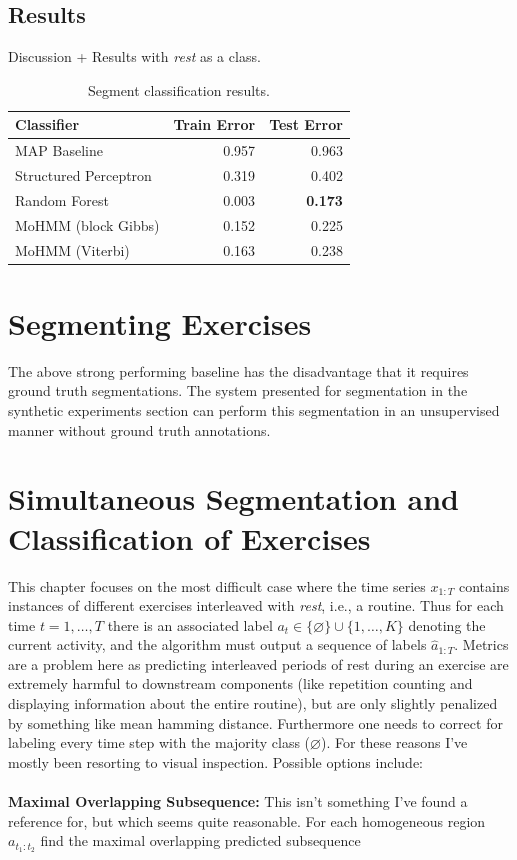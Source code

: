 \documentclass[12pt]{report}
\newcommand{\1}[0]{\mathbbm{1}}
\newcommand{\seq}[3]{\ensuremath{#1_{{#2}:{#3}}}}
\begin{document}
\section{Results}
Discussion + Results with \emph{rest} as a class.
\begin{table}[ht]
    \centering
    \begin{tabular}{l r r}\hline
    \textbf{Classifier} & \textbf{Train Error} &\textbf{Test Error} \\\hline
    MAP Baseline & 0.957 & 0.963 \\
    Structured Perceptron & 0.319 & 0.402 \\
    Random Forest & 0.003 & \textbf{0.173} \\
    MoHMM (block Gibbs) & 0.152 & 0.225 \\
    MoHMM (Viterbi) & 0.163 & 0.238 \\
    \end{tabular}
    \caption{Segment classification results.}
    \label{table:segment-results}
\end{table}

\chapter{Segmenting Exercises}
The above strong performing baseline has the disadvantage that it requires ground truth
segmentations. The system presented for segmentation in the synthetic experiments section
can perform this segmentation in an unsupervised manner without ground truth annotations.

\chapter{Simultaneous Segmentation and Classification of Exercises}
This chapter focuses on the most difficult case where the time series $\seq{x}{1}{T}$
contains instances of different exercises interleaved with \emph{rest}, i.e., a routine. 
Thus for each time $t = 1,\ldots,T$ there is an associated label 
$a_t \in \{\varnothing\} \cup \{1, \ldots, K\}$ denoting the current activity, and the algorithm
must output a sequence of labels $\seq{\hat{a}}{1}{T}$.
Metrics are a problem here as predicting interleaved periods of rest during an exercise
are extremely harmful to downstream components (like repetition counting and displaying
information about the entire routine), but are only slightly penalized by something like
mean hamming distance. Furthermore one needs to correct for labeling every time step with the 
majority class ($\varnothing$). For these reasons I've mostly been resorting to visual 
inspection. Possible options include:
\\\\
\textbf{Maximal Overlapping Subsequence:} This isn't something I've found a reference for,
but which seems quite reasonable. For each homogeneous region $\seq{a}{t_1}{t_2}$ find the
maximal overlapping predicted subsequence 
\end{document}
